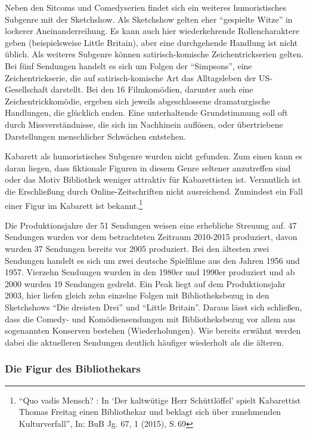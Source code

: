 Neben den Sitcoms und Comedyserien findet sich ein weiteres
humoristisches Subgenre mit der Sketchshow. Als Sketchshow gelten eher
\enquote{gespielte Witze} in lockerer Aneinanderreihung. Es kann auch
hier wiederkehrende Rollencharaktere geben (beispielsweise Little
Britain), aber eine durchgehende Handlung ist nicht üblich. Als weiteres
Subgenre können satirisch-komische Zeichentrickserien gelten. Bei fünf
Sendungen handelt es sich um Folgen der \enquote{Simpsons}, eine
Zeichentrickserie, die auf satirisch-komische Art das Alltagsleben der
US-Gesellschaft darstellt. Bei den 16 Filmkomödien, darunter auch eine
Zeichentrickkomödie, ergeben sich jeweils abgeschlossene dramaturgische
Handlungen, die glücklich enden. Eine unterhaltende Grundstimmung soll
oft durch Missverständnisse, die sich im Nachhinein auflösen, oder
übertriebene Darstellungen menschlicher Schwächen entstehen.

Kabarett als humoristisches Subgenre wurden nicht gefunden. Zum einen
kann es daran liegen, dass fiktionale Figuren in diesem Genre seltener
anzutreffen sind oder das Motiv Bibliothek weniger attraktiv für
Kabarettisten ist. Vermutlich ist die Erschließung durch
Online-Zeitschriften nicht ausreichend. Zumindest ein Fall einer Figur
im Kabarett ist bekannt.\footnote{\enquote{Quo vadis Mensch? : In
  \enquote{Der kaltwütige Herr Schüttlöffel} spielt Kabarettist Thomas
  Freitag einen Bibliothekar und beklagt sich über zunehmenden
  Kulturverfall}, In: BuB Jg. 67, 1 (2015), S.\,69}

Die Produktionsjahre der 51 Sendungen weisen eine erhebliche Streuung
auf. 47 Sendungen wurden vor dem betrachteten Zeitraum 2010-2015
produziert, davon wurden 37 Sendungen bereits vor
2005 produziert. Bei den ältesten zwei Sendungen handelt es sich um zwei
deutsche Spielfilme aus den Jahren 1956 und 1957. Vierzehn Sendungen
wurden in den 1980er und 1990er produziert und ab 2000 wurden 19
Sendungen gedreht. Ein Peak liegt auf dem Produktionsjahr 2003, hier
liefen gleich zehn einzelne Folgen mit Bibliotheksbezug in den
Sketchshows \enquote{Die dreisten Drei} und \enquote{Little Britain}.
Daraus lässt sich schließen, dass die Comedy- und Komödiensendungen mit
Bibliotheksbezug vor allem aus sogenannten Konserven bestehen
(Wiederholungen). Wie bereits erwähnt werden dabei die aktuelleren
Sendungen deutlich häufiger wiederholt als die älteren.

\subsubsection{Die Figur des
Bibliothekars}\label{die-figur-des-bibliothekars}

